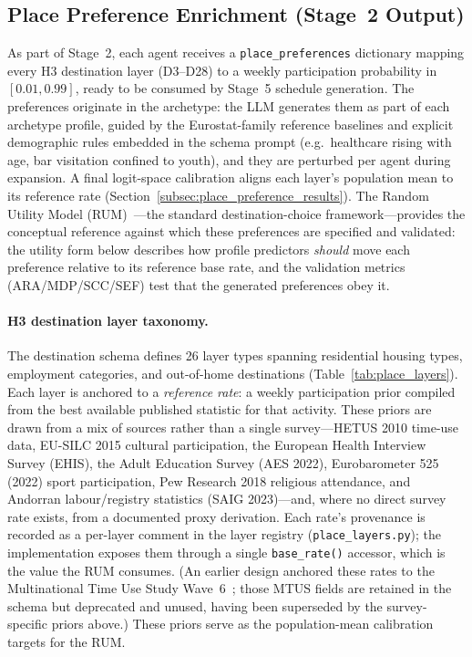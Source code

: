 \documentclass[a4paper,12pt]{article}
\begin{document}
\subsection{Place Preference Enrichment (Stage~2 Output)}
\label{subsec:place_preferences}

As part of Stage~2, each agent receives a \texttt{place\_preferences} dictionary
mapping every H3 destination layer (D3--D28) to a weekly participation probability
in $[0.01, 0.99]$, ready to be consumed by Stage~5 schedule generation. The
preferences originate in the archetype: the LLM generates them as part of each
archetype profile, guided by the Eurostat-family reference baselines and explicit
demographic rules embedded in the schema prompt (e.g.\ healthcare rising with age,
bar visitation confined to youth), and they are perturbed per agent during
expansion. A final logit-space calibration aligns each layer's population mean to
its reference rate (Section~\ref{subsec:place_preference_results}). The Random
Utility Model (RUM)~\cite{ben1985discrete}---the standard destination-choice
framework---provides the conceptual reference against which these preferences are
specified and validated: the utility form below describes how profile predictors
\emph{should} move each preference relative to its reference base rate, and the
validation metrics (ARA/MDP/SCC/SEF) test that the generated preferences obey it.

\paragraph{H3 destination layer taxonomy.}
The destination schema defines 26 layer types spanning residential housing
types, employment categories, and out-of-home destinations (Table~\ref{tab:place_layers}).
Each layer is anchored to a \emph{reference rate}: a weekly participation prior
compiled from the best available published statistic for that activity. These
priors are drawn from a mix of sources rather than a single survey---HETUS 2010
time-use data, EU-SILC 2015 cultural participation, the European Health Interview
Survey (EHIS), the Adult Education Survey (AES 2022), Eurobarometer 525 (2022)
sport participation, Pew Research 2018 religious attendance, and Andorran
labour/registry statistics (SAIG 2023)---and, where no direct survey rate exists,
from a documented proxy derivation. Each rate's provenance is recorded as a
per-layer comment in the layer registry (\texttt{place\_layers.py}); the
implementation exposes them through a single \texttt{base\_rate()} accessor, which
is the value the RUM consumes. (An earlier design anchored these rates to the
Multinational Time Use Study Wave~6~\cite{gershuny2014mtus}; those MTUS fields are
retained in the schema but deprecated and unused, having been superseded by the
survey-specific priors above.) These priors serve as the population-mean
calibration targets for the RUM.
\end{document}
